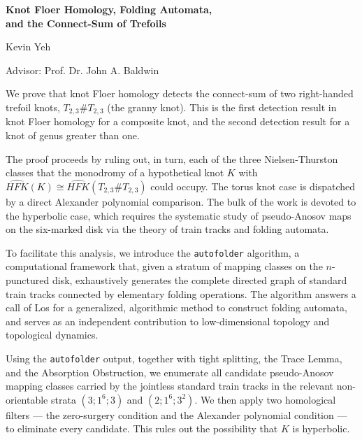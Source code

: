 %
%
\thispagestyle{empty}

\begin{center}
    {\bfseries Knot Floer Homology, Folding Automata,\\
     and the Connect-Sum of Trefoils}

    \vspace{0.4em}

    Kevin Yeh

    \vspace{0.4em}

    Advisor: Prof. Dr. John A. Baldwin
\end{center}

\vspace{1.5em}

We prove that knot Floer homology detects the connect-sum of two right-handed trefoil knots, $T_{2,3} \# T_{2,3}$ (the granny knot). This is the first detection result in knot Floer homology for a composite knot, and the second detection result for a knot of genus greater than one.

The proof proceeds by ruling out, in turn, each of the three Nielsen-Thurston classes that the monodromy of a hypothetical knot $K$ with $\widehat{HFK}(K) \cong \widehat{HFK}(T_{2,3}\#T_{2,3})$ could occupy. The torus knot case is dispatched by a direct Alexander polynomial comparison. The bulk of the work is devoted to the hyperbolic case, which requires the systematic study of pseudo-Anosov maps on the six-marked disk via the theory of train tracks and folding automata.

To facilitate this analysis, we introduce the \texttt{autofolder} algorithm, a computational framework that, given a stratum of mapping classes on the $n$-punctured disk, exhaustively generates the complete directed graph of standard train tracks connected by elementary folding operations. The algorithm answers a call of Los for a generalized, algorithmic method to construct folding automata, and serves as an independent contribution to low-dimensional topology and topological dynamics.

Using the \texttt{autofolder} output, together with tight splitting, the Trace Lemma, and the Absorption Obstruction, we enumerate all candidate pseudo-Anosov mapping classes carried by the jointless standard train tracks in the relevant non-orientable strata $(3;1^6;3)$ and $(2;1^6;3^2)$. We then apply two homological filters --- the zero-surgery condition and the Alexander polynomial condition --- to eliminate every candidate. This rules out the possibility that $K$ is hyperbolic.

